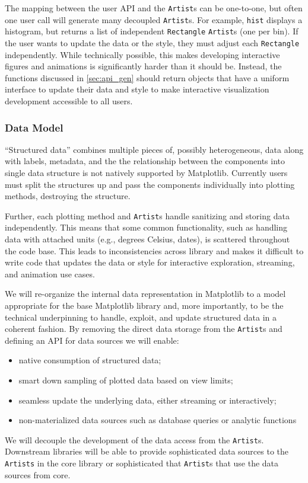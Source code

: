 \documentclass[11pt]{article}  %
\begin{document}
The mapping between the user API and the \texttt{Artist}s can be
one-to-one, but often one user call will generate many decoupled
\texttt{Artist}s.  For example, \texttt{hist} displays a histogram,
but returns a list of independent \texttt{Rectangle} \texttt{Artist}s
(one per bin).  If the user wants to update the data or the style,
they must adjust each \texttt{Rectangle} independently.  While
technically possible, this makes developing interactive figures and
animations is significantly harder than it should be.  Instead, the
functions discussed in \ref{sec:api_gen} should return objects that
have a uniform interface to update their data and style to make
interactive visualization development accessible to all users.



\subsubsection{Data Model}
\label{sec:dm}

``Structured data'' combines multiple pieces of, possibly
heterogeneous, data along with labels, metadata, and the the
relationship between the components into single data structure is
not natively supported by Matplotlib.
 Currently users must split the structures up and pass the
components individually into
plotting methods, destroying the structure.


Further, each plotting method and \texttt{Artist}s handle sanitizing
and storing data independently.  This means that some common
functionality, such as handling data with attached units (e.g.,
degrees Celsius, dates), is scattered throughout the code base.  This
leads to inconsistencies across library and makes it difficult to
write code that updates the data or style for interactive exploration,
streaming, and animation use cases.


We will re-organize the internal data representation in Matplotlib to
a model appropriate for the base Matplotlib library and, more
importantly, to be the technical underpinning to handle, exploit, and
update structured data in a coherent fashion.
By removing the direct data storage from
the \texttt{Artist}s and defining an API for data sources we will enable:
\begin{itemize}[noitemsep]
  \item native consumption of structured data;
  \item smart down sampling of plotted data based on view limits;
  \item seamless update the underlying data, either
    streaming or interactively;
  \item non-materialized data sources such as database queries or analytic functions
\end{itemize}
We will decouple the development of the data access from the
\texttt{Artist}s.  Downstream libraries will be able to provide
sophisticated data sources to the \texttt{Artists} in the core library
or sophisticated that \texttt{Artist}s that use the data sources from
core.
\end{document}
